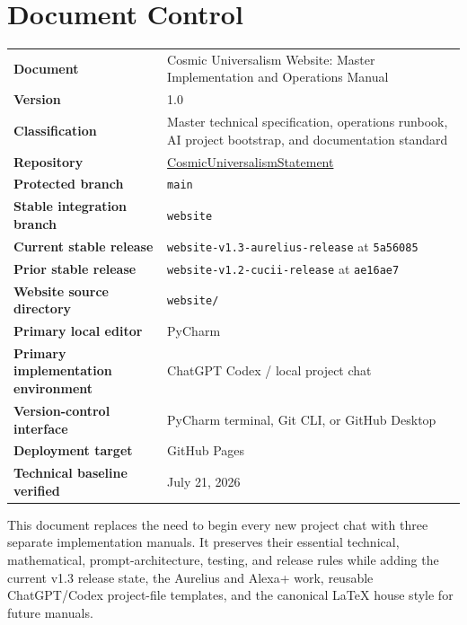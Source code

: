 \documentclass[11pt,letterpaper]{article}
\newcommand{\RepositoryName}{CosmicUniversalismStatement}
\newcommand{\RepositoryURL}{https://github.com/willmaddock/CosmicUniversalismStatement}
\newcommand{\ProtectedBranch}{main}
\newcommand{\StableBranch}{website}
\newcommand{\WebsiteDirectory}{website/}
\newcommand{\CurrentReleaseTag}{website-v1.3-aurelius-release}
\newcommand{\CurrentReleaseCommit}{5a56085}
\newcommand{\PriorReleaseTag}{website-v1.2-cucii-release}
\newcommand{\PriorReleaseCommit}{ae16ae7}
\newcommand{\DocumentVersion}{1.0}
\newcommand{\VerificationDate}{July 21, 2026}
\newcommand{\filepath}[1]{\nolinkurl{#1}}
\newcommand{\branchname}[1]{\texttt{#1}}
\newcommand{\release}[1]{\texttt{#1}}
\begin{document}
\hypersetup{pageanchor=true}
\nopagecolor
\color{CUText}

\section*{Document Control}

\begin{tabularx}{\textwidth}{>{\bfseries}L{1.95in}Y}
Document & Cosmic Universalism Website: Master Implementation and Operations Manual \\
Version & \DocumentVersion \\
Classification & Master technical specification, operations runbook, AI project bootstrap, and documentation standard \\
Repository & \href{\RepositoryURL}{\RepositoryName} \\
Protected branch & \branchname{\ProtectedBranch} \\
Stable integration branch & \branchname{\StableBranch} \\
Current stable release & \release{\CurrentReleaseTag} at \release{\CurrentReleaseCommit} \\
Prior stable release & \release{\PriorReleaseTag} at \release{\PriorReleaseCommit} \\
Website source directory & \filepath{\WebsiteDirectory} \\
Primary local editor & PyCharm \\
Primary implementation environment & ChatGPT Codex / local project chat \\
Version-control interface & PyCharm terminal, Git CLI, or GitHub Desktop \\
Deployment target & GitHub Pages \\
Technical baseline verified & \VerificationDate \\
\end{tabularx}

\begin{purposebox}
This document replaces the need to begin every new project chat with three
separate implementation manuals. It preserves their essential technical,
mathematical, prompt-architecture, testing, and release rules while adding the
current v1.3 release state, the Aurelius and Alexa+ work, reusable ChatGPT/Codex
project-file templates, and the canonical LaTeX house style for future manuals.
\end{purposebox}
\end{document}
